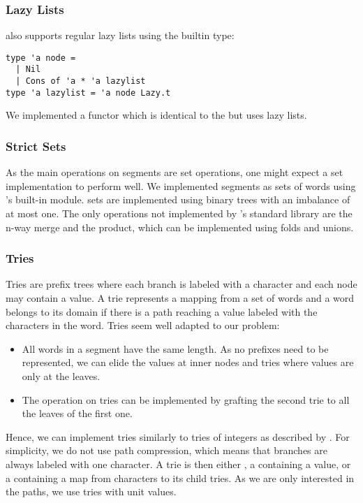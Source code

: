 \subsubsection{Lazy Lists}

\ocaml also supports regular lazy lists using the builtin  type:

\begin{lstlisting}
type 'a node =
  | Nil
  | Cons of 'a * 'a lazylist
type 'a lazylist = 'a node Lazy.t
\end{lstlisting}

We implemented a  functor which is identical to the
 but uses lazy lists.

\subsubsection{Strict Sets}

As the main operations on segments are set operations, one might 
expect a set implementation to perform well. We implemented segments as sets
of words using \ocaml's built-in  module. \ocaml sets are implemented
using binary trees with an imbalance of at most one.
The only operations not implemented by \ocaml's standard library are
the n-way merge and the product, which can be implemented using folds and unions.

\subsubsection{Tries}

Tries \cite{Fredkin1960} are prefix trees where each branch is labeled
with a character and each node may contain a value. A trie 
represents a mapping from a set of words and a word belongs to its domain if there is a
path reaching a value labeled with the characters in the word.
Tries seem well adapted to our problem:
\begin{itemize}
\item All words in a segment have the same length. As no prefixes need
  to be represented, we can elide the values at inner nodes and tries
  where values are only at the leaves.
\item The  operation on tries can be implemented by
  grafting the second trie to all the leaves of the first one.
\end{itemize}

Hence, we can implement tries similarly to tries of integers as described
by \citet{Okasaki98fastmergeable}.
For simplicity, we do not use path compression, which means
that branches are always labeled with one character.
A trie is then either , a  containing a value, or a  containing a map from characters
to its child tries. As we are only interested in the paths, we use tries with unit values. 

